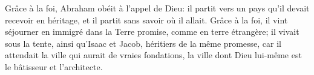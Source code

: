 Grâce à la foi, Abraham obéit à l’appel de Dieu:
	il partit vers un pays qu’il devait recevoir en héritage,
	et il partit sans savoir où il allait.
Grâce à la foi, il vint séjourner en immigré dans la Terre promise,
	comme en terre étrangère;
	il vivait sous la tente, ainsi qu’Isaac et Jacob, héritiers de la même promesse,
	car il attendait la ville qui aurait de vraies fondations,
	la ville dont Dieu lui-même est le bâtisseur et l’architecte.
